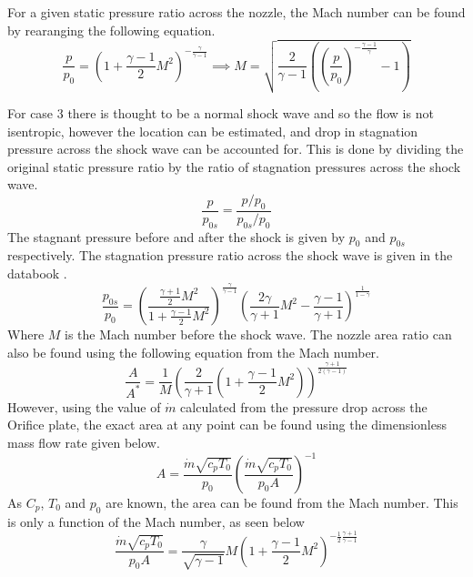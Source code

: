 \documentclass{article}
\begin{document}
For a given static pressure ratio across the nozzle, the Mach number can be found by rearanging the following equation.
\begin{equation}
    \frac{p}{p_0} = \left( 1 + \frac{\gamma - 1}{2}M^2\right) ^ {-\frac{\gamma}{\gamma-1}} \implies M = \sqrt{\frac{2}{\gamma-1} \left( \left( \frac{p}{p_0}\right) ^ {-\frac{\gamma-1}{\gamma}} - 1\right)}
\end{equation}

For case 3 there is thought to be a normal shock wave and so the flow is not isentropic, however the location can be estimated, and drop in stagnation pressure across the shock wave can be accounted for.
This is done by dividing the original static pressure ratio by the ratio of stagnation pressures across the shock wave.
\begin{equation}
    \frac{p}{p_{0s}} = \frac{p/p_0}{p_{0s}/p_0}
\end{equation}
The stagnant pressure before and after the shock is given by $p_0$ and $p_{0s}$ respectively.
The stagnation pressure ratio across the shock wave is given in the databook \cite{data_book}.
\begin{equation}
    \frac{p_{0s}}{p_0} = \left( \frac{\frac{\gamma+1}{2}M^2}{1 + \frac{\gamma-1}{2}M^2}\right) ^ \frac{\gamma}{\gamma-1} \left( \frac{2\gamma}{\gamma+1} M^2 - \frac{\gamma-1}{\gamma+1}\right) ^ \frac{1}{1 - \gamma}
\end{equation}
Where $M$ is the Mach number before the shock wave.
The nozzle area ratio can also be found using the following equation from the Mach number.
\begin{equation}
    \frac{A}{A^*} = \frac{1}{M} \left( \frac{2}{\gamma+1} \left( 1 + \frac{\gamma-1}{2}M^2\right) \right) ^ {\frac{\gamma+1}{2(\gamma-1)}}
\end{equation}
However, using the value of $\dot{m}$ calculated from the pressure drop across the Orifice plate, the exact area at any point can be found using the dimensionless mass flow rate given below.
\begin{equation}
    A = \frac{\dot{m}\sqrt{c_pT_0}}{p_0} \left( \frac{\dot{m}\sqrt{c_pT_0}}{p_0A} \right)^{-1}
    \label{eqn:area}
\end{equation}
As $C_p$, $T_0$ and $p_0$ are known, the area can be found from the Mach number.
This is only a function of the Mach number, as seen below
\begin{equation}
    \frac{\dot{m}\sqrt{c_pT_0}}{p_0A} = \frac{\gamma}{\sqrt{\gamma-1}} M \left(1 + \frac{\gamma - 1}{2} M^2 \right) ^ {- \frac{1}{2}\frac{\gamma + 1}{\gamma - 1}} 
\end{equation}
\end{document}
